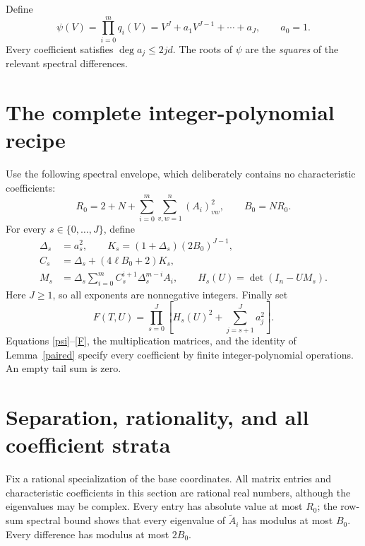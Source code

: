 \documentclass[11pt]{article}
\begin{document}
Define
\begin{equation}\label{psi}
 \psi(V)=\prod_{i=0}^m q_i(V)
        =V^J+a_1V^{J-1}+\cdots+a_J,\qquad a_0=1.
\end{equation}
Every coefficient satisfies \(\deg a_j\le2jd\). The roots of
\(\psi\) are the \emph{squares} of the relevant spectral differences.

\section{The complete integer-polynomial recipe}

Use the following spectral envelope, which deliberately contains
no characteristic coefficients:
\begin{equation}\label{envelope}
 R_0=2+N+\sum_{i=0}^m\sum_{v,w=1}^n(A_i)_{vw}^2,
       \qquad B_0=NR_0.
\end{equation}
For every \(s\in\{0,\ldots,J\}\), define
\begin{align}
 \Delta_s&=a_s^2,\qquad
 K_s=(1+\Delta_s)(2B_0)^{J-1},\label{K}\\
 C_s&=\Delta_s+(4\ell B_0+2)K_s,\label{C}\\
 M_s&=\Delta_s\sum_{i=0}^m
       C_s^{i+1}\Delta_s^{m-i}A_i,\qquad
 H_s(U)=\det(I_n-UM_s).\label{matrix}
\end{align}
Here \(J\ge1\), so all exponents are nonnegative integers.
Finally set
\begin{equation}\label{F}
 \boxed{F(T,U)=\prod_{s=0}^J
       \left[H_s(U)^2+\sum_{j=s+1}^J a_j^2\right].}
\end{equation}
Equations \eqref{psi}--\eqref{F}, the multiplication matrices, and the
identity of Lemma~\ref{paired} specify every coefficient by finite
integer-polynomial operations. An empty tail sum is zero.

\section{Separation, rationality, and all coefficient strata}

Fix a rational specialization of the base coordinates. All matrix
entries and characteristic coefficients in this section are rational
real numbers, although the eigenvalues may be complex. Every entry
has absolute value at most \(R_0\); the row-sum spectral bound shows
that every eigenvalue of \(\widetilde A_i\) has modulus at most
\(B_0\). Every difference has modulus at most \(2B_0\).
\end{document}
